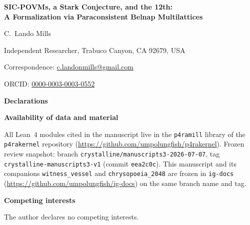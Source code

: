 \documentclass[12pt,a4paper]{article}
\begin{document}
\begin{center}

\vspace*{1.5em}

{\LARGE\bfseries SIC-POVMs, a Stark Conjecture, and the 12th:\\[0.4em]
A Formalization via Paraconsistent Belnap Multilattices}

\vspace{1.5em}

{\large C.\ Lando Mills}

\vspace{0.6em}

{\normalsize Independent Researcher, Trabuco Canyon, CA 92679, USA}

\vspace{0.4em}

{\normalsize Correspondence: \href{mailto:c.landonmills@gmail.com}{c.landonmills@gmail.com}}

\vspace{0.2em}

{\normalsize ORCID: \href{https://orcid.org/0000-0003-0003-0552}{0000-0003-0003-0552}}

\end{center}

\vspace{1.5em}

\noindent\textbf{Declarations}

\vspace{0.8em}

\noindent\textbf{Availability of data and material}

\noindent
All Lean~4 modules cited in the manuscript live in the \texttt{p4ramill} library of the
\texttt{p4rakernel} repository (\url{https://github.com/umpolungfish/p4rakernel}).
Frozen review snapshot: branch \texttt{crystalline/manuscripts3-2026-07-07}, tag
\texttt{crystalline-manuscripts3-v1} (commit \texttt{eea2c0c}).
This manuscript and its companions \texttt{witness\_vessel} and \texttt{chrysopoeia\_2048}
are frozen in \texttt{ig-docs} (\url{https://github.com/umpolungfish/ig-docs}) on the same
branch name and tag.

\vspace{1em}

\noindent\textbf{Competing interests}

\noindent
The author declares no competing interests.

\vspace{1em}
\end{document}
